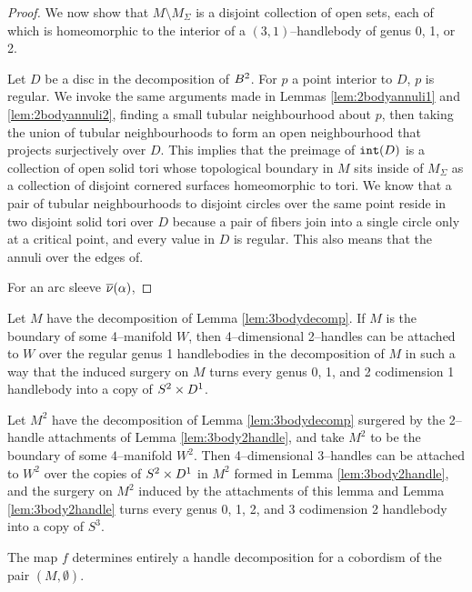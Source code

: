 \begin{proof}
	We now show that $M\setminus M_\Sigma$ is a disjoint collection of open sets, each of which is homeomorphic to the interior of a $(3,1)$--handlebody of genus 0, 1, or 2.
	
	Let $D$ be a disc in the decomposition of $B^2$.
	For $p$ a point interior to $D$, $p$ is regular.
	We invoke the same arguments made in Lemmas \ref{lem:2bodyannuli1} and \ref{lem:2bodyannuli2}, finding a small tubular neighbourhood about $p$, then taking the union of tubular neighbourhoods to form an open neighbourhood that projects surjectively over $D$.
	This implies that the preimage of $\mathtt{int}(D)$ is a collection of open solid tori whose topological boundary in $M$ sits inside of $M_\Sigma$ as a collection of disjoint cornered surfaces homeomorphic to tori.
	We know that a pair of tubular neighbourhoods to disjoint circles over the same point reside in two disjoint solid tori over $D$ because a pair of fibers join into a single circle only at a critical point, and every value in $D$ is regular.
	This also means that the annuli over the edges of.
	
	For an arc sleeve $\overline{\nu}(\alpha)$, 
	
	
\end{proof}

\begin{lem}
	\label{lem:3body2handle}
	Let $M$ have the decomposition of Lemma \ref{lem:3bodydecomp}.
	If $M$ is the boundary of some 4--manifold $W$, then 4--dimensional 2--handles can be attached to $W$ over the regular genus 1 handlebodies in the decomposition of $M$ in such a way that the induced surgery on $M$ turns every genus 0, 1, and 2 codimension 1 handlebody into a copy of $S^2\times D^1$.
\end{lem}

\begin{lem}
	\label{lem:3body3handle}
	Let $M^2$ have the decomposition of Lemma \ref{lem:3bodydecomp} surgered by the 2--handle attachments of Lemma \ref{lem:3body2handle}, and take $M^2$ to be the boundary of some 4--manifold $W^2$.
	Then 4--dimensional 3--handles can be attached to $W^2$ over the copies of $S^2\times D^1$ in $M^2$ formed in Lemma \ref{lem:3body2handle}, and the surgery on $M^2$ induced by the attachments of this lemma and Lemma \ref{lem:3body2handle} turns every genus 0, 1, 2, and 3 codimension 2 handlebody into a copy of $S^3$.
\end{lem}

\begin{theorem}
	\label{lem:3body4handle}
	\label{thm:3bound4}
	The map $f$ determines entirely a handle decomposition for a cobordism of the pair $(M,\emptyset)$.
\end{theorem}

